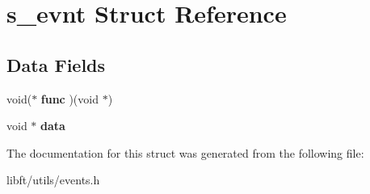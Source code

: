 \hypertarget{structs__evnt}{}\section{s\+\_\+evnt Struct Reference}
\label{structs__evnt}
\subsection*{Data Fields}
\begin{DoxyCompactItemize}
\item 
\hypertarget{structs__evnt_aafa4de7eba1964256e77c9a22675faaf}{}void($\ast$ {\bfseries func} )(void $\ast$)\label{structs__evnt_aafa4de7eba1964256e77c9a22675faaf}

\item 
\hypertarget{structs__evnt_a735984d41155bc1032e09bece8f8d66d}{}void $\ast$ {\bfseries data}\label{structs__evnt_a735984d41155bc1032e09bece8f8d66d}

\end{DoxyCompactItemize}


The documentation for this struct was generated from the following file\+:\begin{DoxyCompactItemize}
\item 
libft/utils/events.\+h\end{DoxyCompactItemize}
